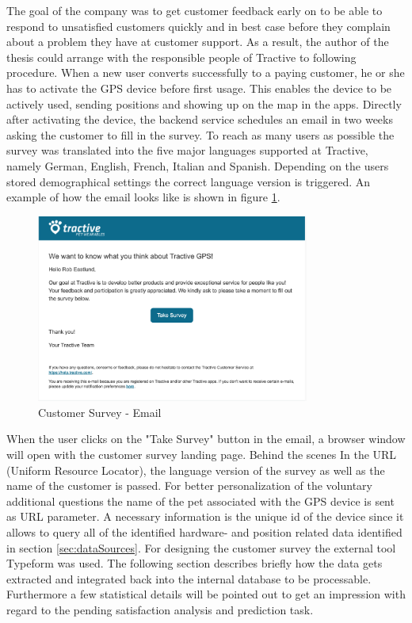 The goal of the company was to get customer feedback early on to be able to respond to unsatisfied customers quickly and in best case before they complain about a problem they have at customer support. As a result, the author of the thesis could arrange with the responsible people of Tractive to following procedure. When a new user converts successfully to a paying customer, he or she has to activate the GPS device before first usage. This enables the device to be actively used, sending positions and showing up on the map in the apps. Directly after activating the device, the backend service schedules an email in two weeks asking the customer to fill in the survey. To reach as many users as possible the survey was translated into the five major languages supported at Tractive, namely German, English, French, Italian and Spanish. Depending on the users stored demographical settings the correct language version is triggered. An example of how the email looks like is shown in figure \ref{fig:customerSurveyEmail}.

\begin{figure}
	\centering
	\includegraphics[width=0.8\textwidth]{img/customerSurveyEmail.png}
	\caption{Customer Survey - Email}
	\label{fig:customerSurveyEmail}
\end{figure} 

When the user clicks on the "Take Survey" button in the email, a browser window will open with the customer survey landing page. Behind the scenes In the URL (Uniform Resource Locator), the language version of the survey as well as the name of the customer is passed. For better personalization of the voluntary additional questions the name of the pet associated with the GPS device is sent as URL parameter. A necessary information is the unique id of the device since it allows to query all of the identified hardware- and position related data identified in section \ref{sec:dataSources}. For designing the customer survey the external tool Typeform was used. The following section describes briefly how the data gets extracted and integrated back into the internal database to be processable. Furthermore a few statistical details will be pointed out to get an impression with regard to the pending satisfaction analysis and prediction task.

